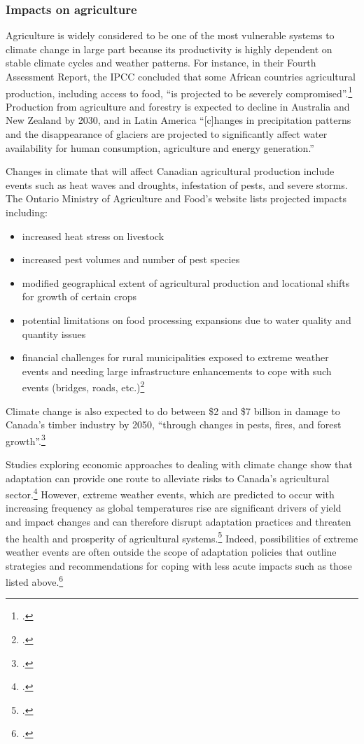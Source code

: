 	\subsubsection{Impacts on agriculture}



Agriculture is widely considered to be one of the most vulnerable systems to climate change in large part because its productivity is highly dependent on stable climate cycles and weather patterns.
For instance, in their Fourth Assessment Report, the IPCC concluded that some African countries agricultural production, including access to food, ``is projected to be severely compromised''.\footcite[][See: Synthesis report, Table SPM.2. Examples of some projected regional impacts. \url{https://www.ipcc.ch/publications_and_data/ar4/syr/en/spms3.html}]{IPCC2007}
Production from agriculture and forestry is expected to decline in Australia and New Zealand by 2030, and in Latin America ``[c]hanges in precipitation patterns and the disappearance of glaciers are projected to significantly affect water availability for human consumption, agriculture and energy generation.''



Changes in climate that will affect Canadian agricultural production include events such as heat waves and droughts, infestation of pests, and severe storms.
The Ontario Ministry of Agriculture and Food's website lists projected impacts including:
\begin{itemize}
	\item increased heat stress on livestock
	\item increased pest volumes and number of pest species
	\item modified geographical extent of agricultural production and locational shifts for growth of certain crops
	\item potential limitations on food processing expansions due to water quality and quantity issues
	\item financial challenges for rural municipalities exposed to extreme weather events and needing large infrastructure enhancements to cope with such events (bridges, roads, etc.)\footcite{OntarioCCandAg}
\end{itemize}
Climate change is also expected to do between \$2 and \$7 billion in damage to Canada's timber industry by 2050, ``through changes in pests, fires, and forest growth''.\footcite[][p.16]{NRTEEPrice}


Studies exploring economic approaches to dealing with climate change show that adaptation can provide one route to alleviate risks to Canada's agricultural sector.\footcite{Amiraslany2010}
However, extreme weather events, which are predicted to occur with increasing frequency as global temperatures rise are significant drivers of yield and impact changes and can therefore disrupt adaptation practices and threaten the health and prosperity of agricultural systems.\footcite{IsikDevadoss2006}
Indeed, possibilities of extreme weather events are often outside the scope of adaptation policies that outline strategies and recommendations for coping with less acute impacts such as those listed above.\footcite[See for instance:][]{Malcolm2012}


